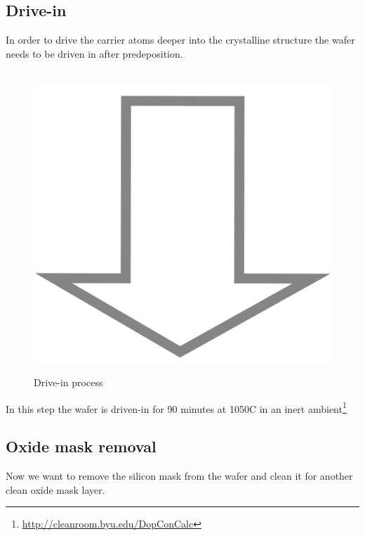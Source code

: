 \newpage

\subsection{Drive-in}
In order to drive the carrier atoms deeper into the crystalline structure the wafer needs to be driven in after predeposition.

\begin{figure}[H]
	\centering
	\begin{tikzpicture}[node distance = 3cm, auto, thick,scale=\CrossSectionOnly, every node/.style={transform shape}]
		
	\end{tikzpicture} \\
	\includegraphics[scale=0.01]{down_arrow.png} \\
	\begin{tikzpicture}[node distance = 3cm, auto, thick,scale=\CrossSectionOnly, every node/.style={transform shape}]
		
	\end{tikzpicture}
	\caption{Drive-in process}
\end{figure}

In this step the wafer is  driven-in for 90 minutes at 1050\degree C in an inert ambient\footnote{\url{http://cleanroom.byu.edu/DopConCalc}}

\subsection{Oxide mask removal}
Now we want to remove the silicon mask from the wafer and clean it for another clean oxide mask layer.

